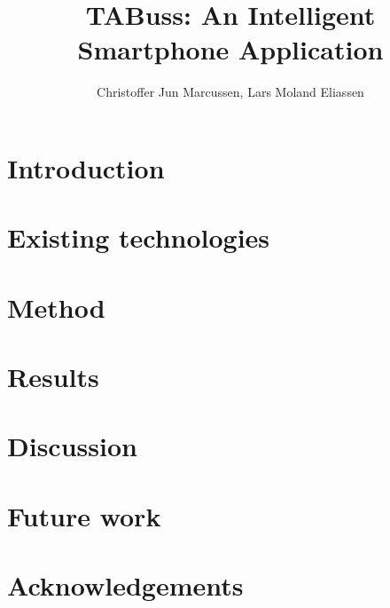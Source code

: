 \documentclass[11pt,a4paper]{article}
\begin{document}
\author{Christoffer Jun Marcussen, Lars Moland Eliassen}
\title{TABuss: An Intelligent Smartphone Application}
\maketitle
\clearpage
\begin{abstract}

\end{abstract}
\newpage
\tableofcontents

\clearpage
\section{Introduction}

\section{Existing technologies}

\section{Method}

\section{Results}

\section{Discussion}

\section{Future work}

\newpage
\section{Acknowledgements}



\end{document}
